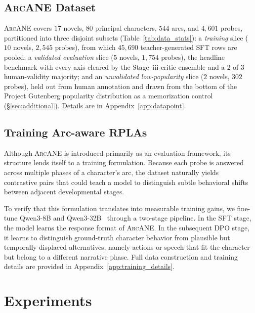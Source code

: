 \documentclass[11pt]{article}
\newcommand{\ours}{\textsc{ArcANE}}
\begin{document}
\subsection{\ours{} Dataset}
\label{sec:dataset}

\ours{} covers $17$ novels, $80$ principal characters, $544$ arcs, and $4{,}601$ probes, partitioned into three disjoint subsets (Table~\ref{tab:data_stats}): a \emph{training} slice ($10$ novels, $2{,}545$ probes), from which $45{,}690$ teacher-generated SFT rows are pooled; a \emph{validated evaluation} slice ($5$ novels, $1{,}754$ probes), the headline benchmark with every axis cleared by the Stage~iii critic ensemble and a $2$-of-$3$ human-validity majority; and an \emph{unvalidated low-popularity} slice ($2$ novels, $302$ probes), held out from human annotation and drawn from the bottom of the Project Gutenberg popularity distribution as a memorization control (\S\ref{sec:additional}). Details are in Appendix~\ref{app:datapoint}.

\subsection{Training Arc-aware RPLAs}
\label{sec:training_rpla}

Although \ours{} is introduced primarily as an evaluation framework, its structure lends itself to a training formulation. Because each probe is answered across multiple phases of a character's arc, the dataset naturally yields contrastive pairs that could teach a model to distinguish subtle behavioral shifts between adjacent developmental stages.

To verify that this formulation translates into measurable training gains, we fine-tune Qwen3-8B and Qwen3-32B~\citep{yang2025qwen3} through a two-stage pipeline. In the SFT stage, the model learns the response format of \ours{}. In the subsequent DPO stage, it learns to distinguish ground-truth character behavior from plausible but temporally displaced alternatives, namely actions or speech that fit the character but belong to a different narrative phase. Full data construction and training details are provided in Appendix~\ref{app:training_details}.


\section{Experiments}
\label{sec:experiments}
\end{document}
